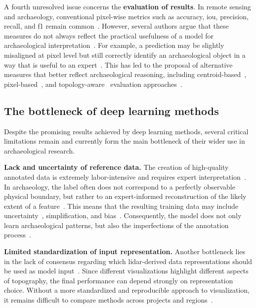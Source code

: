 A fourth unresolved issue concerns the \textbf{evaluation of results}. In remote sensing and archaeology, conventional pixel-wise metrics such as accuracy, \gls{iou}, precision, recall, and \gls{f1} remain common~\cite{fiorucci_deep_2022,guyot_objective_2021}. However, several authors argue that these measures do not always reflect the practical usefulness of a model for archaeological interpretation~\cite{fiorucci_deep_2022,bundzel_semantic_2020,guyot_objective_2021}. For example, a prediction may be slightly misaligned at pixel level but still correctly identify an archaeological object in a way that is useful to an expert~\cite{fiorucci_deep_2022}. This has led to the proposal of alternative measures that better reflect archaeological reasoning, including centroid-based~\cite{fiorucci_deep_2022}, pixel-based~\cite{fiorucci_deep_2022}, and topology-aware~\cite{mosinska_beyond_2018} evaluation approaches~\cite{fiorucci_deep_2022,zhang_unveiling_2024,MILIARESIS20071076,grenier_accuracy_nodate}.

\subsection{The bottleneck of deep learning methods}
Despite the promising results achieved by deep learning methods, several critical limitations remain and currently form the main bottleneck of their wider use in archaeological research.

\textbf{Lack and uncertainty of reference data.}
The creation of high-quality annotated data is extremely labor-intensive and requires expert interpretation~\cite{somrak_learning_2020,bundzel_semantic_2020}. In archaeology, the label often does not correspond to a perfectly observable physical boundary, but rather to an expert-informed reconstruction of the likely extent of a feature~\cite{guyot_objective_2021,bundzel_semantic_2020}. This means that the resulting training data may include uncertainty~\cite{frenay_classification_2014}, simplification, and bias~\cite{cowley_what_2016,bundzel_semantic_2020}. Consequently, the model does not only learn archaeological patterns, but also the imperfections of the annotation process~\cite{rahaman_effects_2022}.

\textbf{Limited standardization of input representation.}
Another bottleneck lies in the lack of consensus regarding which \gls{lidar}-derived data representations should be used as model input~\cite{kokalj_standardizing_2025}. Since different visualizations highlight different aspects of topography, the final performance can depend strongly on representation choice. Without a more standardized and reproducible approach to visualization, it remains difficult to compare methods across projects and regions~\cite{kokalj_standardizing_2025}.

